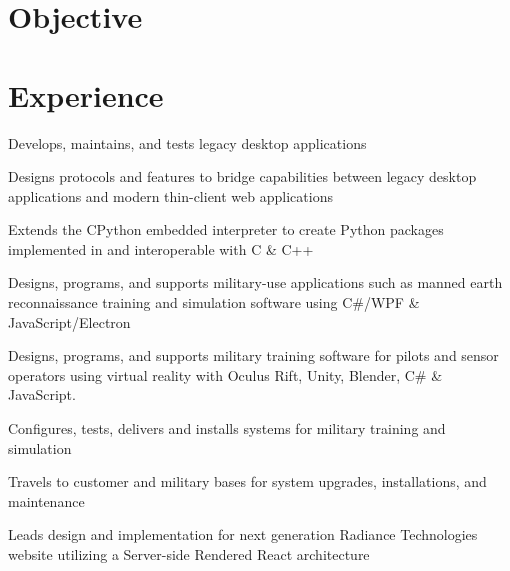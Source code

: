 \documentclass[]{resume}
\begin{document}
\begin{minipage}[t]{0.66\textwidth}

\section{Objective}
\sectionsep


\section{Experience}

\vspace{\topsep} %
\begin{tightemize}
\item Develops, maintains, and tests legacy desktop applications
\item Designs protocols and features to bridge capabilities between legacy desktop applications and modern thin-client web applications
\item Extends the CPython embedded interpreter to create Python packages implemented in and interoperable with C \& C++
\end{tightemize}

\sectionsep

\begin{tightemize}
\item Designs, programs, and supports military-use applications such as manned earth reconnaissance training and simulation software using C\#/WPF \& JavaScript/Electron
\item Designs, programs, and supports military training software for pilots and sensor operators using virtual reality with Oculus Rift, Unity, Blender, C\# \& JavaScript.
\item Configures, tests, delivers and installs systems for military training and simulation
\item Travels to customer and military bases for system upgrades, installations, and maintenance
\item Leads design and implementation for next generation Radiance Technologies website utilizing a Server-side Rendered React architecture
\end{tightemize}


\end{minipage}
\end{document}
